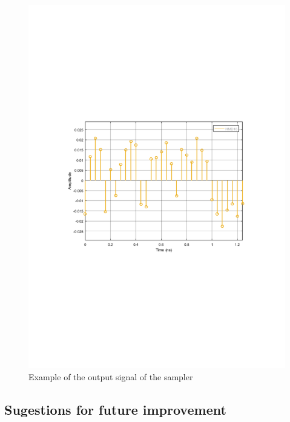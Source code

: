 \begin{figure}[h]
	\centering
	\includegraphics[clip, trim=0.5cm 9cm 0.5cm 9cm, width=\textwidth]{./lib/sampler/figures/MQAM_sampler_output.pdf}
	\caption{Example of the output signal of the sampler}\label{Sampler_output}
\end{figure}

\subsection*{Sugestions for future improvement}

